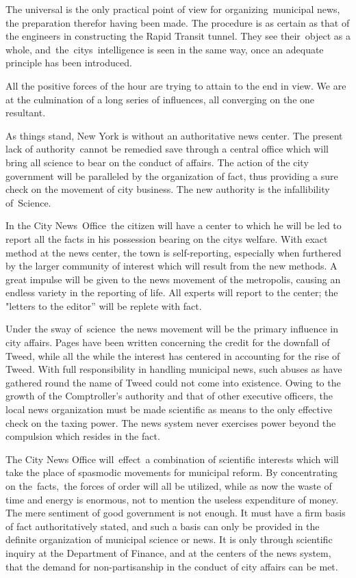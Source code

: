 \documentclass[openany,nobib]{tufte-book}
\begin{document}
The universal is the only practical point of view for
organizing~municipal news, the preparation therefor having been made.
The procedure is as certain as that of the engineers in constructing the
Rapid Transit tunnel. They see their~object as a whole,
and~the~city\textquotesingle s~intelligence is seen in the same way,
once an adequate principle has been introduced.~~

All the positive forces of the hour are trying to attain to the end in
view. We are at the culmination of a long series of influences, all
converging on the one resultant.~~

As things stand, New York is without an authoritative news center. The
present lack of authority~cannot be remedied save through a central
office which will bring all science to bear on the conduct of affairs.
The action of the city government will be paralleled by the organization
of fact, thus providing a sure check on the movement of city business.
The new authority is the infallibility of~Science.~~

In the City News~Office~the citizen will have a center to which he will
be led to report all the facts in his possession bearing on the
city\textquotesingle s welfare. With exact method at the news center,
the town is self-reporting, especially when furthered by the larger
community of interest which will result from the new methods. A great
impulse will be given to the news movement of the metropolis, causing an
endless variety in the reporting of life. All experts will report to the
center; the "letters to the editor'' will be replete with fact.~

Under the sway of~science~the news movement will be the primary
influence in city affairs. Pages have been written concerning the credit
for the downfall of Tweed, while all the while the interest has centered
in accounting for the rise of Tweed. With full responsibility in
handling municipal news, such abuses as have gathered round the name of
Tweed could not come into existence. Owing to the growth of the
Comptroller's authority and that of other executive officers, the local
news organization must be made scientific as means to the only effective
check on the taxing power. The news system never exercises power beyond
the compulsion which resides in the fact.~~

The City News Office will~effect~a combination of scientific interests
which will take the place of spasmodic movements for municipal reform.
By concentrating on the~facts,~the forces of order will all be utilized,
while as now the waste of time and energy is enormous, not to mention
the useless expenditure of money. The mere sentiment of good government
is not enough. It must have a firm basis of fact authoritatively stated,
and such a basis can only be provided in the definite organization of
municipal science or news. It is only through scientific inquiry at the
Department of Finance, and at the centers of the news system, that the
demand for non-partisanship in the conduct of city affairs can be met.~
\end{document}
